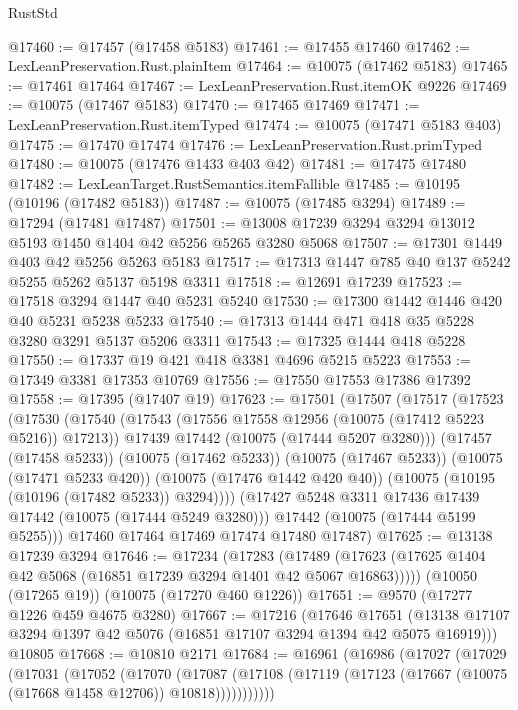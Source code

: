 \begin{lexlean}{RustStd}
\begin{coremodule}
@17460 := @17457 (@17458 @5183)
@17461 := @17455 @17460
@17462 := LexLeanPreservation.Rust.plainItem
@17464 := @10075 (@17462 @5183)
@17465 := @17461 @17464
@17467 := LexLeanPreservation.Rust.itemOK @9226
@17469 := @10075 (@17467 @5183)
@17470 := @17465 @17469
@17471 := LexLeanPreservation.Rust.itemTyped
@17474 := @10075 (@17471 @5183 @403)
@17475 := @17470 @17474
@17476 := LexLeanPreservation.Rust.primTyped
@17480 := @10075 (@17476 @1433 @403 @42)
@17481 := @17475 @17480
@17482 := LexLeanTarget.RustSemantics.itemFallible
@17485 := @10195 (@10196 (@17482 @5183))
@17487 := @10075 (@17485 @3294)
@17489 := @17294 (@17481 @17487)
@17501 := @13008 @17239 @3294 @3294 @13012 @5193 @1450 @1404 @42 @5256 @5265 @3280 @5068
@17507 := @17301 @1449 @403 @42 @5256 @5263 @5183
@17517 := @17313 @1447 @785 @40 @137 @5242 @5255 @5262 @5137 @5198 @3311
@17518 := @12691 @17239
@17523 := @17518 @3294 @1447 @40 @5231 @5240
@17530 := @17300 @1442 @1446 @420 @40 @5231 @5238 @5233
@17540 := @17313 @1444 @471 @418 @35 @5228 @3280 @3291 @5137 @5206 @3311
@17543 := @17325 @1444 @418 @5228
@17550 := @17337 @19 @421 @418 @3381 @4696 @5215 @5223
@17553 := @17349 @3381 @17353 @10769
@17556 := @17550 @17553 @17386 @17392
@17558 := @17395 (@17407 @19)
@17623 := @17501
    (@17507
      (@17517
        (@17523
          (@17530
            (@17540
              (@17543 (@17556 @17558 @12956 (@10075 (@17412 @5223 @5216)) @17213))
              @17439
              @17442
              (@10075 (@17444 @5207 @3280)))
            (@17457 (@17458 @5233))
            (@10075 (@17462 @5233))
            (@10075 (@17467 @5233))
            (@10075 (@17471 @5233 @420))
            (@10075 (@17476 @1442 @420 @40))
            (@10075 (@10195 (@10196 (@17482 @5233)) @3294))))
        (@17427 @5248 @3311 @17436 @17439 @17442 (@10075 (@17444 @5249 @3280)))
        @17442
        (@10075 (@17444 @5199 @5255)))
      @17460
      @17464
      @17469
      @17474
      @17480
      @17487)
@17625 := @13138 @17239 @3294
@17646 := @17234
    (@17283 (@17489 (@17623 (@17625 @1404 @42 @5068 (@16851 @17239 @3294 @1401 @42 @5067 @16863)))))
    (@10050 (@17265 @19))
    (@10075 (@17270 @460 @1226))
@17651 := @9570 (@17277 @1226 @459 @4675 @3280)
@17667 := @17216
    (@17646
      @17651
      (@13138 @17107 @3294 @1397 @42 @5076 (@16851 @17107 @3294 @1394 @42 @5075 @16919)))
    @10805
@17668 := @10810 @2171
@17684 := @16961
    (@16986
      (@17027
        (@17029
          (@17031
            (@17052
              (@17070
                (@17087
                  (@17108 (@17119 (@17123 (@17667 (@10075 (@17668 @1458 @12706)) @10818)))))))))))

\end{coremodule}
\end{lexlean}
